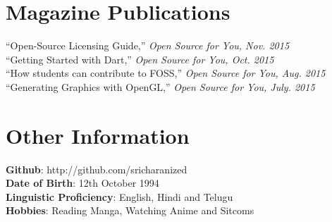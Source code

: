 \documentclass{res}
\begin{document}
\begin{resume}
\section{Magazine Publications} 
\vspace{0.1in}
``Open-Source Licensing Guide,'' {\it Open Source for You, Nov. 2015} \\
``Getting Started with Dart,'' {\it Open Source for You, Oct. 2015} \\
``How students can contribute to FOSS,'' {\it Open Source for You, Aug. 2015} \\
``Generating Graphics with OpenGL,'' {\it Open Source for You, July. 2015} 


\section{Other Information} 
\vspace{0.1in} 
    {\bf Github}: http://github.com/sricharanized \\
    {\bf Date of Birth}: 12th October 1994 \\
		{\bf Linguistic Proficiency}: English, Hindi and Telugu \\
		{\bf Hobbies}: Reading Manga, Watching Anime and Sitcoms 

\end{resume}
\end{document}
